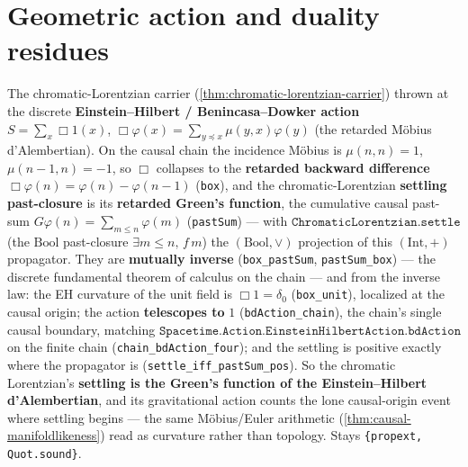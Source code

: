 \section{Geometric action and duality residues}

\begin{theorem}\label{thm:chromatic-lorentzian-action}\leanok{}
The chromatic-Lorentzian carrier (\cref{thm:chromatic-lorentzian-carrier}) thrown at the discrete
\textbf{Einstein--Hilbert / Benincasa--Dowker action} $S = \sum_x \Box 1(x)$, $\Box\varphi(x) =
\sum_{y \preceq x} \mu(y,x)\varphi(y)$ (the retarded M\"obius d'Alembertian). On the causal chain the
incidence M\"obius is $\mu(n,n) = 1$, $\mu(n{-}1,n) = -1$, so $\Box$ collapses to the \textbf{retarded
backward difference} $\Box\varphi(n) = \varphi(n) - \varphi(n{-}1)$ (\texttt{box}), and the
chromatic-Lorentzian \textbf{settling past-closure} is its \textbf{retarded Green's function}, the
cumulative causal past-sum $G\varphi(n) = \sum_{m \leq n}\varphi(m)$ (\texttt{pastSum}) --- with
$\texttt{ChromaticLorentzian.settle}$ (the $\mathrm{Bool}$ past-closure $\exists m \leq n,\, f\,m$) the
$(\mathrm{Bool},\vee)$ projection of this $(\mathrm{Int},+)$ propagator. They are \textbf{mutually inverse}
(\texttt{box\_pastSum}, \texttt{pastSum\_box}) --- the discrete fundamental theorem of calculus on the
chain --- and from the inverse law: the EH curvature of the unit field is $\Box 1 = \delta_0$
(\texttt{box\_unit}), localized at the causal origin; the action \textbf{telescopes to} $1$
(\texttt{bdAction\_chain}), the chain's single causal boundary, matching $\texttt{Spacetime.Action.EinsteinHilbertAction.bdAction}$
on the finite chain (\texttt{chain\_bdAction\_four}); and the settling is positive exactly where the
propagator is (\texttt{settle\_iff\_pastSum\_pos}). So the chromatic Lorentzian's \textbf{settling is the
Green's function of the Einstein--Hilbert d'Alembertian}, and its gravitational action counts the lone
causal-origin event where settling begins --- the same M\"obius/Euler arithmetic
(\cref{thm:causal-manifoldlikeness}) read as curvature rather than topology. Stays
\texttt{\{propext, Quot.sound\}}.
\end{theorem}

